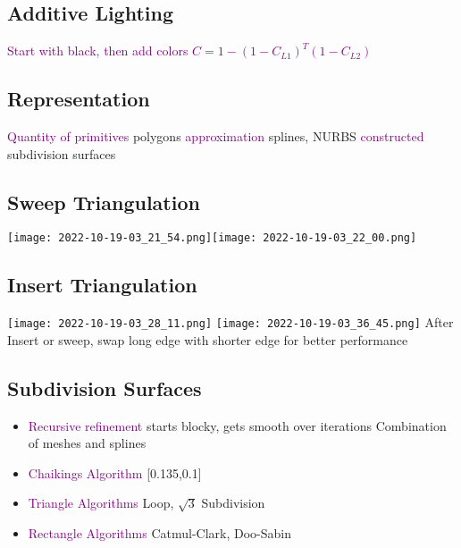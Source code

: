 \documentclass[main.tex,fontsize=12pt,paper=a4,paper=landscape,DIV=calc,]{scrartcl}
\begin{document}
\begin{multicols*}{4}
\subsection{Additive Lighting}
\textcolor{purple}{Start with black, then add colors}\newline
\textcolor{purple}{\(C = 1 - (1 - C_{L1} )^T (1 - C_{L2} )\)}

\subsection{Representation}
\textcolor{purple}{Quantity of primitives} polygons\newline
\textcolor{purple}{approximation} splines, NURBS\newline
\textcolor{purple}{constructed} subdivision surfaces

\subsection{Sweep Triangulation}
\texttt{[image: 2022-10-19-03\_21\_54.png]}\texttt{[image: 2022-10-19-03\_22\_00.png]}\newline

\subsection{Insert Triangulation}
\texttt{[image: 2022-10-19-03\_28\_11.png]}
\texttt{[image: 2022-10-19-03\_36\_45.png]}\newline
After Insert or sweep, swap long edge with shorter edge for better performance\newline

\subsection{Subdivision Surfaces}
\begin{itemize}
\item \textcolor{purple}{Recursive refinement}\newline
starts blocky, gets smooth over iterations\newline
\textcolor{OliveGreen}{Combination of meshes and splines}
\item \textcolor{purple}{Chaikings Algorithm}\newline
{}[0.135,0.1]
\item \textcolor{purple}{Triangle Algorithms}\newline
  Loop, \(\sqrt{3}\) Subdivision
\item \textcolor{purple}{Rectangle Algorithms}\newline
  Catmul-Clark, Doo-Sabin
\end{itemize}


\end{multicols*}
\end{document}
